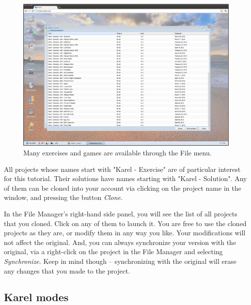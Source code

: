 \documentclass[article,A4,12pt]{llncs}
\begin{document}
\begin{figure}[!ht]
\begin{center}
\includegraphics[width=\textwidth]{img/cloning.png}
\end{center}
\caption{Many exercises and games are available through the File menu.}
\label{fig:cloning}
\end{figure}
\newpage
\noindent
All projects whose names start with "Karel - Exercise" are of particular interest 
for this tutorial. Their solutions have names starting with "Karel - Solution". 
Any of them can be cloned into your account via clicking on the project name in the window, 
and pressing the button {\em Clone}.

In the File Manager's right-hand side panel, you will see the list of all 
projects that you cloned. Click on any of them to launch it. You are free to 
use the cloned projects as they are, or modify them in any way you like. Your 
modifications will not affect the original. And, you can 
always synchronize your version with the original, via 
a right-click on the project in the File Manager and selecting {\em Synchronize}.
Keep in mind though -- synchronizing with the original will erase any changes that 
you made to the project.

\subsection{Karel modes} \label{levels}
\end{document}
